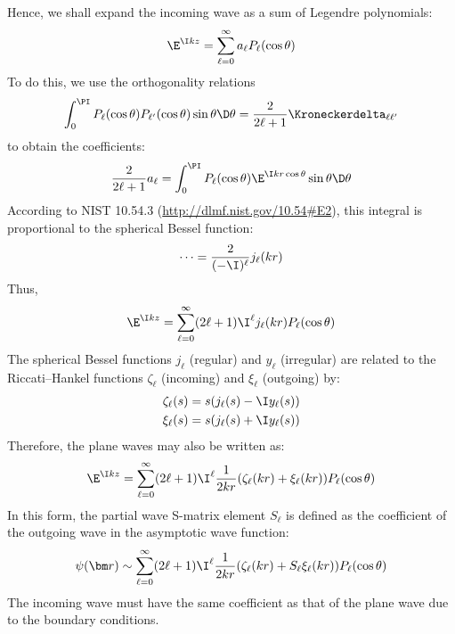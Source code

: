 \documentclass[fleqn, 12pt]{article}
\begin{document}
\begin{enumerate}
  Hence, we shall expand the incoming wave as a sum of Legendre polynomials:
  \begin{align*}
    \E^{\I k z} =
    \sum_{\ell = 0}^\infty a_\ell P_\ell(\cos \theta)
  \end{align*}
  To do this, we use the orthogonality relations
  \begin{align}
     \int_0^\PI P_\ell(\cos \theta) P_{\ell'}(\cos \theta) \sin \theta \D \theta
    = \frac{2}{2 \ell + 1} \Kroneckerdelta_{\ell \ell'}
    \label{eq:legendre-orthogonality}
  \end{align}
  to obtain the coefficients:
  \begin{align*}
     \frac{2}{2 \ell + 1} a_\ell
    = \int_0^\PI P_\ell(\cos \theta) \E^{\I k r \cos \theta} \sin \theta \D \theta
  \end{align*}
  According to NIST 10.54.3 (\url{http://dlmf.nist.gov/10.54#E2}), this
  integral is proportional to the spherical Bessel function:
  \begin{align*}
    \dots = \frac{2}{(-\I)^\ell} j_\ell(k r)
  \end{align*}
  Thus,
  \begin{align*}
    \E^{\I k z} =
    \sum_{\ell = 0}^\infty (2 \ell + 1) \I^\ell j_\ell(k r) P_\ell(\cos \theta)
  \end{align*}
  The spherical Bessel functions $j_\ell$ (regular) and $y_\ell$ (irregular)
  are related to the Riccati--Hankel functions $\zeta_\ell$ (incoming) and
  $\xi_\ell$ (outgoing) by:
  \begin{align*}
    &\zeta_\ell(s) = s (j_\ell(s) - \I y_\ell(s)) \\
    &\xi_\ell(s) = s (j_\ell(s) + \I y_\ell(s))
  \end{align*}
  Therefore, the plane waves may also be written as:
  \begin{align*}
    \E^{\I k z} =
    \sum_{\ell = 0}^\infty (2 \ell + 1) \I^\ell
    \frac{1}{2 k r} (\zeta_\ell(k r) + \xi_\ell(k r)) P_\ell(\cos \theta)
  \end{align*}
  In this form, the partial wave S-matrix element $S_\ell$ is defined as the
  coefficient of the outgoing wave in the asymptotic wave function:
  \begin{align*}
    \psi(\bm r) \sim \sum_{\ell = 0}^\infty (2 \ell + 1) \I^\ell
    \frac{1}{2 k r} (\zeta_\ell(k r) + S_\ell \xi_\ell(k r)) P_\ell(\cos \theta)
  \end{align*}
  The incoming wave must have the same coefficient as that of the plane wave
  due to the boundary conditions.


\end{enumerate}
\end{document}
